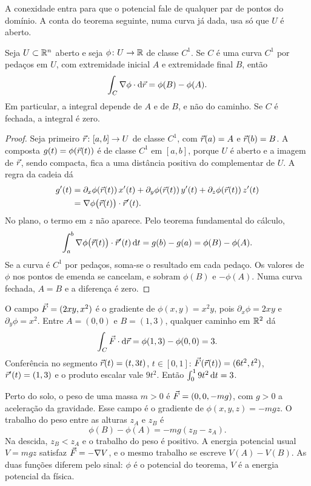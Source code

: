 \documentclass[11pt,a4paper]{article}
\begin{document}
A conexidade entra para que o potencial fale de qualquer par de pontos do domínio. A conta do teorema seguinte, numa curva já dada, usa só que $U$ é aberto.

\begin{teorema}
\label{thm:gradiente}
Seja $U\subset\mathbb{R}^n$ aberto e seja $\phi\colon U\to\mathbb{R}$ de classe $C^1$. Se $C$ é uma curva $C^1$ por pedaços em $U$, com extremidade inicial $A$ e extremidade final $B$, então
\[
\int_C \nabla\phi\cdot\mathrm{d}\vec{r}=\phi(B)-\phi(A).
\]
Em particular, a integral depende de $A$ e de $B$, e não do caminho. Se $C$ é fechada, a integral é zero.
\end{teorema}

\begin{proof}
Seja primeiro $\vec{r}\colon[a,b]\to U$ de classe $C^1$, com $\vec{r}(a)=A$ e $\vec{r}(b)=B$. A composta $g(t)=\phi(\vec{r}(t))$ é de classe $C^1$ em $[a,b]$, porque $U$ é aberto e a imagem de $\vec{r}$, sendo compacta, fica a uma distância positiva do complementar de $U$. A regra da cadeia dá
\begin{align*}
g'(t)
&=\partial_x\phi(\vec{r}(t))\,x'(t)
+\partial_y\phi(\vec{r}(t))\,y'(t)
+\partial_z\phi(\vec{r}(t))\,z'(t)\\
&=\nabla\phi\bigl(\vec{r}(t)\bigr)\cdot\vec{r}'(t).
\end{align*}
No plano, o termo em $z$ não aparece. Pelo teorema fundamental do cálculo,
\[
\int_a^b \nabla\phi\bigl(\vec{r}(t)\bigr)\cdot\vec{r}'(t)\,\mathrm{d} t
=g(b)-g(a)=\phi(B)-\phi(A).
\]
Se a curva é $C^1$ por pedaços, soma-se o resultado em cada pedaço. Os valores de $\phi$ nos pontos de emenda se cancelam, e sobram $\phi(B)$ e $-\phi(A)$. Numa curva fechada, $A=B$ e a diferença é zero.
\end{proof}

\begin{exemplo}
O campo $\vec{F}=(2xy,x^2)$ é o gradiente de $\phi(x,y)=x^2 y$, pois $\partial_x\phi=2xy$ e $\partial_y\phi=x^2$. Entre $A=(0,0)$ e $B=(1,3)$, qualquer caminho em $\mathbb{R}^2$ dá
\[
\int_C\vec{F}\cdot\mathrm{d}\vec{r}=\phi(1,3)-\phi(0,0)=3.
\]
Conferência no segmento $\vec{r}(t)=(t,3t)$, $t\in[0,1]$: $\vec{F}(\vec{r}(t))=(6t^2,t^2)$, $\vec{r}'(t)=(1,3)$ e o produto escalar vale $9t^2$. Então $\int_0^1 9t^2\,\mathrm{d} t=3$.
\end{exemplo}

\begin{exemplo}[Peso]
Perto do solo, o peso de uma massa $m>0$ é $\vec{F}=(0,0,-mg)$, com $g>0$ a aceleração da gravidade. Esse campo é o gradiente de $\phi(x,y,z)=-mgz$. O trabalho do peso entre as alturas $z_A$ e $z_B$ é
\[
\phi(B)-\phi(A)=-mg(z_B-z_A).
\]
Na descida, $z_B<z_A$ e o trabalho do peso é positivo. A energia potencial usual $V=mgz$ satisfaz $\vec{F}=-\nabla V$, e o mesmo trabalho se escreve $V(A)-V(B)$. As duas funções diferem pelo sinal: $\phi$ é o potencial do teorema, $V$ é a energia potencial da física.
\end{exemplo}
\end{document}
